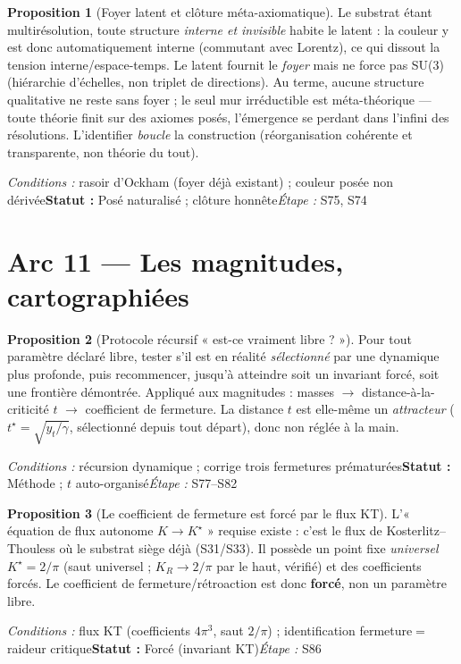\documentclass[11pt,a4paper]{article}
\theoremstyle{definition}
\newtheorem{prop}{Proposition}
\newcommand{\statut}[3]{\par\smallskip\noindent\textit{Conditions :} #1\quad\textbf{Statut :} #2\quad\textit{Étape :} #3\par\medskip}
\begin{document}
\begin{prop}[Foyer latent et clôture méta-axiomatique]
Le substrat étant multirésolution, toute structure \emph{interne et invisible} habite le latent : la couleur y est donc automatiquement interne (commutant avec Lorentz), ce qui dissout la tension interne/espace-temps. Le latent fournit le \emph{foyer} mais ne force pas SU(3) (hiérarchie d'échelles, non triplet de directions). Au terme, aucune structure qualitative ne reste sans foyer ; le seul mur irréductible est méta-théorique — toute théorie finit sur des axiomes posés, l'émergence se perdant dans l'infini des résolutions. L'identifier \emph{boucle} la construction (réorganisation cohérente et transparente, non théorie du tout).
\end{prop}
\statut{rasoir d'Ockham (foyer déjà existant) ; couleur posée non dérivée}{Posé naturalisé ; clôture honnête}{S75, S74}

\section*{Arc 11 — Les magnitudes, cartographiées}

\begin{prop}[Protocole récursif « est-ce vraiment libre ? »]
Pour tout paramètre déclaré libre, tester s'il est en réalité \emph{sélectionné} par une dynamique plus profonde, puis recommencer, jusqu'à atteindre soit un invariant forcé, soit une frontière démontrée. Appliqué aux magnitudes : masses $\to$ distance-à-la-criticité $t$ $\to$ coefficient de fermeture. La distance $t$ est elle-même un \emph{attracteur} ($t^\star=\sqrt{y_t/\gamma}$, sélectionné depuis tout départ), donc non réglée à la main.
\end{prop}
\statut{récursion dynamique ; corrige trois fermetures prématurées}{Méthode ; $t$ auto-organisé}{S77--S82}

\begin{prop}[Le coefficient de fermeture est forcé par le flux KT]
L'« équation de flux autonome $K\to K^\star$ » requise existe : c'est le flux de Kosterlitz--Thouless où le substrat siège déjà (S31/S33). Il possède un point fixe \emph{universel} $K^\star=2/\pi$ (saut universel ; $K_R\to 2/\pi$ par le haut, vérifié) et des coefficients forcés. Le coefficient de fermeture/rétroaction est donc \textbf{forcé}, non un paramètre libre.
\end{prop}
\statut{flux KT (coefficients $4\pi^3$, saut $2/\pi$) ; identification fermeture$=$raideur critique}{Forcé (invariant KT)}{S86}
\end{document}
